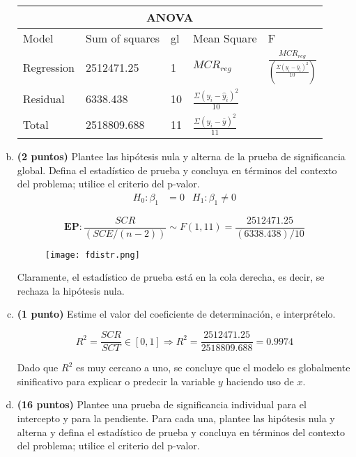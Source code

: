 \documentclass[../main.tex]{subfiles}
\begin{document}
\begin{enumerate}[(a)]
\bigskip
\begin{tabular}{ |p{2cm}||p{2.5cm}|p{1cm}|p{2cm}|p{1.8cm}|  }
 \hline
 \multicolumn{5}{|c|}{ANOVA} \\
 \hline
 Model & Sum of squares & gl & Mean Square & F\\
 \hline
 Regression   & 2512471.25    &1&   $MCR_{reg}$ & $\frac{MCR_{reg}}{\left( \frac{\Sigma \left( y_i - \hat{y}_i\right)^2}{10}\right)}$\\
 Residual   & 6338.438    &10&   $\frac{\Sigma \left( y_i - \hat{y}_i\right)^2}{10}$ &\\
 Total   & 2518809.688    &11&   $\frac{\Sigma \left( y_i - \bar{y}\right)^2}{11}$ &\\
 \hline
\end{tabular}

\item \textbf{(2 puntos)} Plantee las hipótesis nula y alterna de la prueba de significancia global. Defina el estadístico de prueba y concluya en términos del contexto del problema; utilice el criterio del p-valor.
\begin{align*}
	H_0 : \beta_1 &= 0 & H_1 : \beta_1 \neq 0
\end{align*}

$$\textbf{EP} : \frac{SCR}{\left( SCE / (n - 2)\right)} \sim F(1, 11) = \frac{2512471.25}{(6338.438)/10}$$

\begin{figure}[h]
\centering
\texttt{[image: fdistr.png]}
\label{fig:img1}
\end{figure}

Claramente, el estadístico de prueba está en la cola derecha, es decir, se rechaza la hipótesis nula.

\item \textbf{(1 punto)} Estime el valor del coeficiente de determinación, e interprételo.

$$R^2 = \frac{SCR}{SCT} \in \left[0, 1\right] \Rightarrow R^2 = \frac{2512471.25}{2518809.688} = 0.9974$$

Dado que $R^2$ es muy cercano a uno, se concluye que el modelo es globalmente sinificativo para explicar o predecir la variable $y$ haciendo uso de $x$.

\item \textbf{(16 puntos)} Plantee una prueba de significancia individual para el intercepto y para la pendiente. Para cada una, plantee las hipótesis nula y alterna y defina el estadístico de
prueba y concluya en términos del contexto del problema; utilice el criterio del p-valor.


\end{enumerate}
\end{document}
